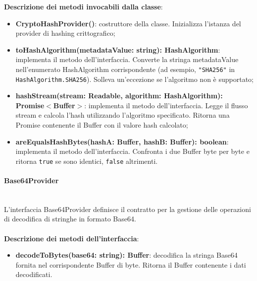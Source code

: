 \documentclass[a4paper,12pt]{article}
\begin{document}
{{{                \noindent \textbf{Descrizione dei metodi invocabili dalla classe}:
                \begin{itemize}
                    \item \textbf{CryptoHashProvider()}: costruttore della classe. Inizializza l'istanza del provider di hashing crittografico;
                    \item \textbf{toHashAlgorithm(metadataValue: string): HashAlgorithm}: implementa il metodo dell'interfaccia. Converte la stringa metadataValue nell'enumerato HashAlgorithm corrispondente (ad esempio, \texttt{"SHA256"} in \texttt{HashAlgorithm.SHA256}). Solleva un'eccezione se l'algoritmo non è supportato;
                    \item \textbf{hashStream(stream: Readable, algorithm: HashAlgorithm):\\ Promise$<$Buffer$>$}: implementa il metodo dell'interfaccia. Legge il flusso stream e calcola l'hash utilizzando l'algoritmo specificato. Ritorna una Promise contenente il Buffer con il valore hash calcolato;
                    \item \textbf{areEqualsHashBytes(hashA: Buffer, hashB: Buffer): boolean}: implementa il metodo dell'interfaccia. Confronta i due Buffer byte per byte e ritorna \texttt{true} se sono identici, \texttt{false} altrimenti.
                \end{itemize}
                \paragraph{Base64Provider}\label{par:Base64Provider}\mbox{}\\
                L'interfaccia Base64Provider definisce il contratto per la gestione delle operazioni di decodifica di stringhe in formato Base64.\\
                \\
                \noindent \textbf{Descrizione dei metodi dell'interfaccia}:
                \begin{itemize}
                    \item \textbf{decodeToBytes(base64: string): Buffer}: decodifica la stringa Base64 fornita nel corrispondente Buffer di byte. Ritorna il Buffer contenente i dati decodificati.
                \end{itemize}
}}}
\end{document}
